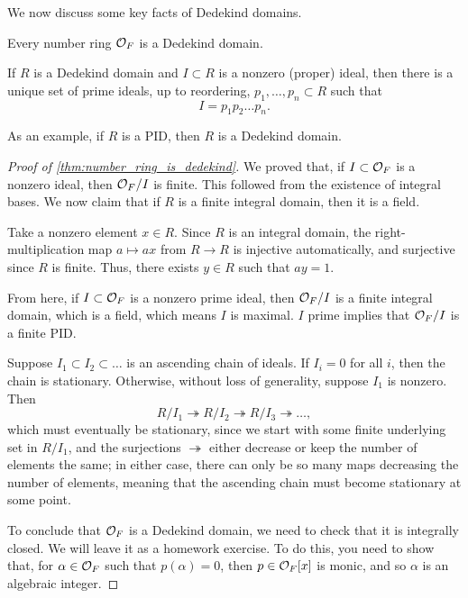 We now discuss some key facts of Dedekind domains.
\begin{theorem} \label{thm:number_ring_is_dedekind}
    Every number ring $\mathcal O_F$ is a Dedekind domain.
\end{theorem}

\begin{theorem*}
    If $R$ is a Dedekind domain and $I \subset R$ is a nonzero (proper) ideal, then there is a unique set of prime ideals, up to reordering, $p_1, \dots, p_n \subset R$ such that
    \[ I = p_1 p_2 \dots p_n. \]
\end{theorem*}

As an example, if $R$ is a PID, then $R$ is a Dedekind domain.

\begin{proof}[Proof of \ref{thm:number_ring_is_dedekind}]
    We proved that, if $I \subset \mathcal O_F$ is a nonzero ideal, then $\mathcal O_F/I$ is finite. This followed from the existence of integral bases. We now claim that if $R$ is a finite integral domain, then it is a field.
    \begin{subproof}
        Take a nonzero element $x \in R$. Since $R$ is an integral domain, the right-multiplication map $a \mapsto ax$ from $R \to R$ is injective automatically, and surjective since $R$ is finite. Thus, there exists $y \in R$ such that $ay = 1$.
    \end{subproof}
    From here, if $I \subset \mathcal O_F$ is a nonzero prime ideal, then $\mathcal O_F/I$ is a finite integral domain, which is a field, which means $I$ is maximal. {\color{airforceblue} $I$ prime implies that $\mathcal O_F/I$ is a finite PID.}

    \newpage
    Suppose $I_1 \subset I_2 \subset \dots$ is an ascending chain of ideals. If $I_i = 0$ for all $i$, then the chain is stationary. Otherwise, without loss of generality, suppose $I_1$ is nonzero. Then
    \[ R/I_1 \twoheadrightarrow R/I_2 \twoheadrightarrow R/I_3 \twoheadrightarrow \dots, \]
    which must eventually be stationary, since we start with some finite underlying set in $R/I_1$, and the surjections $\twoheadrightarrow$ either decrease or keep the number of elements the same; in either case, there can only be so many maps decreasing the number of elements, meaning that the ascending chain must become stationary at some point.

    {\color{airforceblue} To conclude that $\mathcal O_F$ is a Dedekind domain, we need to check that it is integrally closed. We will leave it as a homework exercise. To do this, you need to show that, for $\alpha \in \mathcal O_F$ such that $p(\alpha) = 0$, then $p \in \mathcal O_F[x]$ is monic, and so $\alpha$ is an algebraic integer.}
\end{proof}


